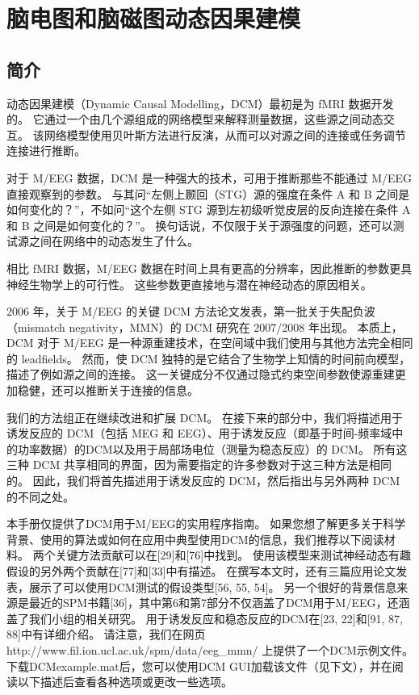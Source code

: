 \chapter{脑电图和脑磁图动态因果建模}
\label{ch:16}


\section{简介}

动态因果建模（Dynamic Causal  Modelling，DCM）最初是为 fMRI 数据开发的。
它通过一个由几个源组成的网络模型来解释测量数据，这些源之间动态交互。
该网络模型使用贝叶斯方法进行反演，从而可以对源之间的连接或任务调节连接进行推断。

对于 M/EEG 数据，DCM 是一种强大的技术，可用于推断那些不能通过 M/EEG 直接观察到的参数。
与其问“左侧上颞回（STG）源的强度在条件 A 和 B 之间是如何变化的？”，不如问“这个左侧 STG 源到左初级听觉皮层的反向连接在条件 A 和 B 之间是如何变化的？”。
换句话说，不仅限于关于源强度的问题，还可以测试源之间在网络中的动态发生了什么。

相比 fMRI 数据，M/EEG 数据在时间上具有更高的分辨率，因此推断的参数更具神经生物学上的可行性。
这些参数更直接地与潜在神经动态的原因相关。

2006 年，关于 M/EEG 的关键 DCM 方法论文发表，第一批关于失配负波（mismatch negativity，MMN）的 DCM 研究在 2007/2008 年出现。
本质上，DCM 对于 M/EEG 是一种源重建技术，在空间域中我们使用与其他方法完全相同的 leadfields。
然而，使 DCM 独特的是它结合了生物学上知情的时间前向模型，描述了例如源之间的连接。
这一关键成分不仅通过隐式约束空间参数使源重建更加稳健，还可以推断关于连接的信息。

我们的方法组正在继续改进和扩展 DCM。
在接下来的部分中，我们将描述用于诱发反应的 DCM（包括 MEG 和 EEG）、用于诱发反应（即基于时间-频率域中的功率数据）的DCM以及用于局部场电位（测量为稳态反应）的 DCM。
所有这三种 DCM 共享相同的界面，因为需要指定的许多参数对于这三种方法是相同的。
因此，我们将首先描述用于诱发反应的 DCM，然后指出与另外两种 DCM 的不同之处。

本手册仅提供了DCM用于M/EEG的实用程序指南。
如果您想了解更多关于科学背景、使用的算法或如何在应用中典型使用DCM的信息，我们推荐以下阅读材料。
两个关键方法贡献可以在[29]和[76]中找到。
使用该模型来测试神经动态有趣假设的另外两个贡献在[77]和[33]中有描述。
在撰写本文时，还有三篇应用论文发表，展示了可以使用DCM测试的假设类型[56, 55, 54]。
另一个很好的背景信息来源是最近的SPM书籍[36]，其中第6和第7部分不仅涵盖了DCM用于M/EEG，还涵盖了我们小组的相关研究。
用于诱发反应和稳态反应的DCM在[23, 22]和[91, 87, 88]中有详细介绍。
请注意，我们在网页http://www.fil.ion.ucl.ac.uk/spm/data/eeg\_mmn/ 上提供了一个DCM示例文件。
下载DCMexample.mat后，您可以使用DCM GUI加载该文件（见下文），并在阅读以下描述后查看各种选项或更改一些选项。


